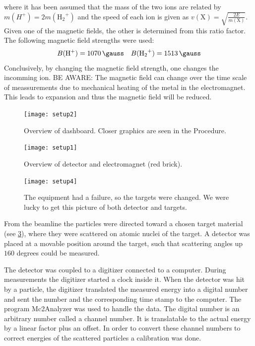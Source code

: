 %
where it has been assumed that the mass of the two ions are related by $m(H^+) = 2m(\mathrm{{H_2}^+})$ and the speed of each ion is given as $v(\mathrm{X}) = \sqrt{\frac{2E}{m(\mathrm{X})}}$. 
%
Given one of the magnetic fields, the other is determined from this ratio factor. The following magnetic field strengths were used:
%
\begin{equation}
    B(\mathrm{H^+}) = \SI{1070}{\gauss} \quad B(\mathrm{{H_2}^+}) = \SI{1513}{\gauss}
\label{}
\end{equation}
%
Conclusively, by changing the magnetic field strength, one changes the
incomming ion. BE AWARE: The magnetic field can change over the time scale of meassurements
due to mechanical heating of the metal in the electromagnet. This leads to expansion and thus
the magnetic field will be reduced.
%
\begin{figure}[t]
    \centering
    \texttt{[image: setup2]}
    \caption{Overview of dashboard. Closer graphics are seen in the Procedure.}
    \label{fig_setup2}
\end{figure}
%
\begin{figure}[t]
    \centering
    \texttt{[image: setup1]}
    \caption{Overview of detector and electromagnet (red brick).}
    \label{fig_setup1}
\end{figure}
%
\begin{figure}[t]
    \centering
    \texttt{[image: setup4]}
    \caption{The equipment had a failure, so the targets were changed. We were
    lucky to get this picture of both detector and targets.}
    \label{fig_setup4}
\end{figure}
%
From the beamline the particles were directed toward a chosen target material
(see \cref{fig_setup4}), where they were scattered on atomic nuclei of the
target. A detector was placed at a movable position around the target, such
that scattering angles up $160$ degrees could be measured.

The detector was coupled to a digitizer connected to a computer. During
measurements the digitizer started a clock inside it. When the detector was hit
by a particle, the digitizer translated the measured energy into a digital
number and sent the number and the corresponding time stamp to the computer.
The program Mc2Analyzer was used to handle the data. The digital number is an
arbitrary number called a channel number. It is translatable to the actual
energy by a linear factor plus an offset. In order to convert these channel
numbers to correct energies of the scattered particles a calibration was done.

